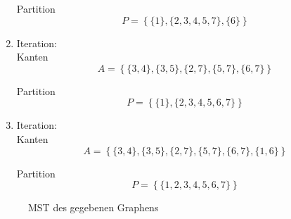 \documentclass[a4paper]{scrartcl}
\begin{document}
\begin{enumerate}
        Partition
        \begin{equation}
            P = \left\{
                \{ 1 \},
                \{ 2, 3, 4, 5, 7 \},
                \{ 6 \}
            \right\}
        \end{equation}
        
    \item Iteration:\\
        Kanten
        \begin{equation}
            A = \left\{
                \{ 3,4 \},
                \{ 3,5 \},
                \{ 2,7 \},
                \{ 5,7 \},
                \{ 6,7 \}
            \right\}
        \end{equation}
        
        Partition
        \begin{equation}
            P = \left\{
                \{ 1 \},
                \{ 2, 3, 4, 5, 6, 7 \}
            \right\}
        \end{equation}
        
    \item Iteration:\\
        Kanten
        \begin{equation}
            A = \left\{
                \{ 3, 4 \},
                \{ 3, 5 \},
                \{ 2, 7 \},
                \{ 5, 7 \},
                \{ 6, 7 \},
                \{ 1, 6 \}
            \right\}
        \end{equation}
        
        Partition
        \begin{equation}
            P = \left\{
                \{ 1, 2, 3, 4, 5, 6, 7 \}
            \right\}
        \end{equation}
        

\end{enumerate}
\begin{figure}[h]
    \centering
    \caption{MST des gegebenen Graphens}
\end{figure}
\end{document}

